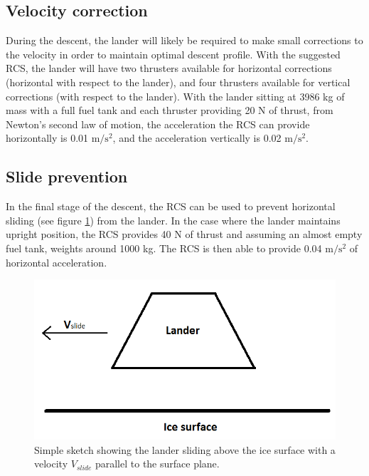 \subsection{Velocity correction}

During the descent, the lander will likely be required to make small corrections to the velocity in order to maintain optimal descent profile. With the suggested RCS, the lander will have two thrusters available for horizontal corrections (horizontal with respect to the lander), and four thrusters available for vertical corrections (with respect to the lander). With the lander sitting at 3986 kg of mass with a full fuel tank and each thruster providing 20 N of thrust, from Newton's second law of motion, the acceleration the RCS can provide horizontally is 0.01 $\mathrm{m/s^2}$, and the acceleration vertically is 0.02 $\mathrm{m/s^2}$. 

\subsection{Slide prevention}

In the final stage of the descent, the RCS can be used to prevent horizontal sliding (see figure \ref{fig:lunar_slide}) from the lander. In the case where the lander maintains upright position, the RCS provides 40 N of thrust and assuming an almost empty fuel tank, weights around 1000 kg. The RCS is then able to provide 0.04 $\mathrm{m/s^2}$ of horizontal acceleration.\\

\begin{figure}[htb]
\begin{center}
\includegraphics[scale=0.8]{figures/RCS/Lunar_slide}
\caption{Simple sketch showing the lander sliding above the ice surface with a velocity $V_{slide}$ parallel to the surface plane.}
\label{fig:lunar_slide}
\end{center}
\end{figure}

